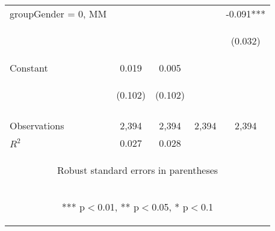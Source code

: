 \begin{center}
\begin{tabular}{lcccc}
groupGender = 0, MM &  &  &  & -0.091*** \\
\vspace{4pt} & \begin{footnotesize}\end{footnotesize} & \begin{footnotesize}\end{footnotesize} & \begin{footnotesize}\end{footnotesize} & \begin{footnotesize}(0.032)\end{footnotesize} \\
Constant & 0.019 & 0.005 &  &  \\
 & \begin{footnotesize}(0.102)\end{footnotesize} & \begin{footnotesize}(0.102)\end{footnotesize} & \begin{footnotesize}\end{footnotesize} & \begin{footnotesize}\end{footnotesize} \\
\vspace{4pt} & \begin{footnotesize}\end{footnotesize} & \begin{footnotesize}\end{footnotesize} & \begin{footnotesize}\end{footnotesize} & \begin{footnotesize}\end{footnotesize} \\
Observations & 2,394 & 2,394 & 2,394 & 2,394 \\
 $R^2$ & 0.027 & 0.028 &  &  \\ \hline
\multicolumn{5}{c}{\begin{footnotesize} Robust standard errors in parentheses\end{footnotesize}} \\
\multicolumn{5}{c}{\begin{footnotesize} *** p$<$0.01, ** p$<$0.05, * p$<$0.1\end{footnotesize}} \\
\end{tabular}
\end{center}
